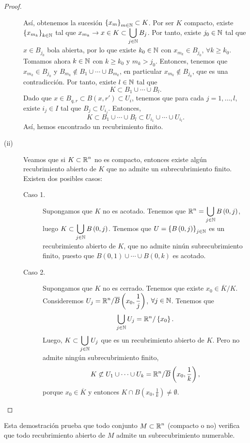 \begin{proof}
\begin{description}
\begin{itemize}
		\end{itemize}
		Así, obtenemos la sucesión $\displaystyle \left\{ x_{m}\right\} _{m\in\mathbb{N}} \subset K $. Por ser $\displaystyle K $ compacto, existe $\displaystyle \left\{ x_{m_{k}}\right\} _{k \in \mathbb{N}} $ tal que $\displaystyle x_{m_{k}} \to x \in K \subset \bigcup_{j \in \mathbb{N}}B_{j} $. 
Por tanto, existe $\displaystyle j_{0} \in \mathbb{N} $ tal que $\displaystyle x \in B_{j_{0}} $ bola abierta, por lo que existe $\displaystyle k_{0} \in \mathbb{N} $ con $\displaystyle x_{m_{k}} \in B_{j_{0}} $, $\displaystyle \forall k \geq k_{0} $.
Tomamos ahora $\displaystyle k \in \mathbb{N} $ con $\displaystyle k \geq k_{0} $ y $\displaystyle m_{k} > j_{0} $. Entonces, tenemos que $\displaystyle x_{m_{k}} \in B_{j_{0}} $ y $\displaystyle B_{m_{k}} \not\in B_{1} \cup \cdots \cup B_{m_{k}} $, en particular $\displaystyle x_{m_{k}} \not\in B_{j_{0}} $, que es una contradicción. 
Por tanto, existe $\displaystyle l \in \mathbb{N} $ tal que 
\[K \subset B_{1} \cup \cdots \cup B_{l} .\]
Dado que $\displaystyle x \in B_{q,r} \subset B\left(x,r'\right) \subset U_{i} $, tenemos que para cada $\displaystyle j = 1, \ldots, l $, existe $\displaystyle i_{j} \in I $ tal que $\displaystyle B_{j} \subset U_{i_{j}} $. Entonces, 
\[K \subset B_{1} \cup \cdots \cup B_{l} \subset U_{i_{1}} \cup \cdots \cup U_{i_{l}} .\]
Así, hemos encontrado un recubrimiento finito.
\item[(ii)] Veamos que si $\displaystyle K \subset \mathbb{R}^{n} $ no es compacto, entonces existe algún recubrimiento abierto de $\displaystyle K $ que no admite un subrecubrimiento finito. Existen dos posibles casos:
	\begin{description}
		\item[Caso 1.] Supongamos que $\displaystyle K $ no es acotado. Tenemos que $\displaystyle \mathbb{R}^{n} = \bigcup_{j \in \mathbb{N}}B\left(0,j\right) $, luego $\displaystyle K \subset \bigcup_{j \in \mathbb{N}}B\left(0,j\right) $. Tenemos que $\displaystyle U = \left\{ B\left(0,j\right)\right\} _{j \in \mathbb{N}} $ es un recubrimiento abierto de $\displaystyle K $, que no admite ninún subrecubrimiento finito, puesto que $\displaystyle B\left(0,1\right) \cup \cdots \cup B\left(0,k\right) $ es acotado. 
		\item[Caso 2.] Supongamos que $\displaystyle K $ no es cerrado. Tenemos que existe $\displaystyle x_{0} \in \overline{K}/K $. Consideremos $\displaystyle U_{j} = \mathbb{R}^{n} / \overline{B}\left(x_{0}, \frac{1}{j}\right) $, $\displaystyle \forall j \in \mathbb{N} $. Tenemos que
			\[\bigcup_{ j \in \mathbb{N}}U_{j} = \mathbb{R}^{n} / \left\{ x_{0}\right\}  .\]
	Luego, $\displaystyle K \subset \bigcup_{j \in \mathbb{N}}U_{j} $ que es un recubrimiento abierto de $\displaystyle K $. Pero no admite ningún subrecubrimiento finito,
	\[ K \not\subset U_{1} \cup \cdots \cup U_{k} = \mathbb{R}^{n} / \overline{B}\left(x_{0}, \frac{1}{k}\right)  ,\]
	porque $\displaystyle x_{0} \in \overline{K} $ y entonces $\displaystyle K \cap B\left(x_{0}, \frac{1}{k}\right)\neq \emptyset $.
	\end{description}
\end{description}
\end{proof}
\begin{observation}
Esta demostración prueba que todo conjunto $\displaystyle M \subset \mathbb{R}^{n} $ (compacto o no) verifica que todo recubrimiento abierto de $\displaystyle M $ admite un subrecubrimiento numerable. 
\end{observation}

